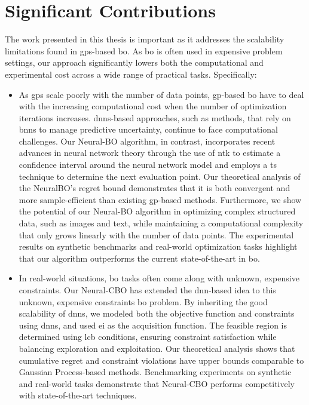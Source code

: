 \section{Significant Contributions}
The work presented in this thesis is important as it addresses the scalability limitations found in \acp{gp}-based \acf{bo}. As \ac{bo} is often used in expensive problem settings, our approach significantly lowers both the computational and experimental cost across a wide range of practical tasks. Specifically: 
\begin{itemize}
    \item As \acp{gp} scale poorly with the number of data points, \ac{gp}-based \ac{bo} have to deal with the increasing computational cost when the number of optimization iterations increases. \acp{dnn}-based approaches, such as methods, that rely on \acp{bnn} to manage predictive uncertainty, continue to face computational challenges. Our Neural-BO algorithm, in contrast,  incorporates recent advances in neural network theory through the use of \ac{ntk} to estimate a confidence interval around the neural network model and employs a \acl{ts} technique to determine the next evaluation point. Our theoretical analysis of the NeuralBO's regret bound demonstrates that it is both convergent and more sample-efficient than existing \ac{gp}-based methods. Furthermore, we show the potential of our Neural-BO algorithm in optimizing complex structured data, such as images and text, while maintaining a computational complexity that only grows linearly with the number of data points. The experimental results on synthetic benchmarks and real-world optimization tasks highlight that our algorithm outperforms the current state-of-the-art in \ac{bo}.  
    \item In real-world situations, \ac{bo} tasks often come along with unknown, expensive constraints. Our Neural-CBO has extended the \ac{dnn}-based idea to this unknown, expensive constraints \ac{bo} problem. By inheriting the good scalability of \acp{dnn},  we modeled both the objective function and constraints using \acp{dnn}, and used \ac{ei} as the acquisition function. The feasible region is determined using \ac{lcb} conditions, ensuring constraint satisfaction while balancing exploration and exploitation. Our theoretical analysis shows that cumulative regret and constraint violations have upper bounds comparable to Gaussian Process-based methods. Benchmarking experiments on synthetic and real-world tasks demonstrate that Neural-CBO performs competitively with state-of-the-art techniques. 

\end{itemize}
